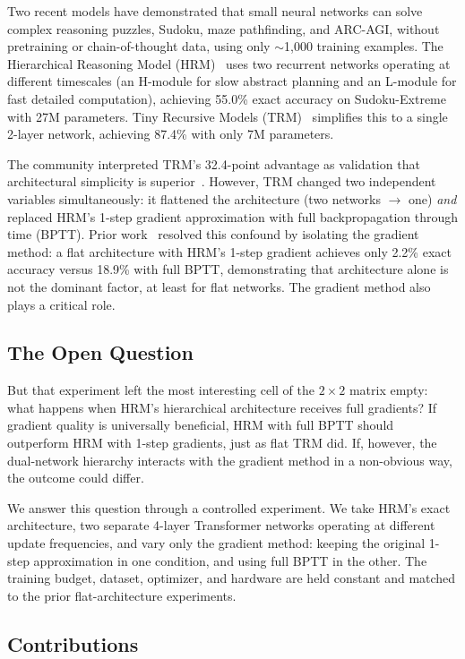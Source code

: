\documentclass{article}
\begin{document}
Two recent models have demonstrated that small neural networks can solve complex reasoning puzzles, Sudoku, maze pathfinding, and ARC-AGI, without pretraining or chain-of-thought data, using only $\sim$1,000 training examples. The Hierarchical Reasoning Model (HRM)~\cite{wang2025hrm} uses two recurrent networks operating at different timescales (an H-module for slow abstract planning and an L-module for fast detailed computation), achieving 55.0\% exact accuracy on Sudoku-Extreme with 27M parameters. Tiny Recursive Models (TRM)~\cite{jolicoeur2025trm} simplifies this to a single 2-layer network, achieving 87.4\% with only 7M parameters.

The community interpreted TRM's 32.4-point advantage as validation that architectural simplicity is superior~\cite{arcprize2025}. However, TRM changed two independent variables simultaneously: it flattened the architecture (two networks $\rightarrow$ one) \emph{and} replaced HRM's 1-step gradient approximation with full backpropagation through time (BPTT). Prior work~\cite{jj2025disentangling} resolved this confound by isolating the gradient method: a flat architecture with HRM's 1-step gradient achieves only 2.2\% exact accuracy versus 18.9\% with full BPTT, demonstrating that architecture alone is not the dominant factor, at least for flat networks. The gradient method also plays a critical role.

\subsection{The Open Question}

But that experiment left the most interesting cell of the $2\times2$ matrix empty: what happens when HRM's hierarchical architecture receives full gradients? If gradient quality is universally beneficial, HRM with full BPTT should outperform HRM with 1-step gradients, just as flat TRM did. If, however, the dual-network hierarchy interacts with the gradient method in a non-obvious way, the outcome could differ.

We answer this question through a controlled experiment. We take HRM's exact architecture, two separate 4-layer Transformer networks operating at different update frequencies, and vary only the gradient method: keeping the original 1-step approximation in one condition, and using full BPTT in the other. The training budget, dataset, optimizer, and hardware are held constant and matched to the prior flat-architecture experiments.

\subsection{Contributions}
\end{document}
